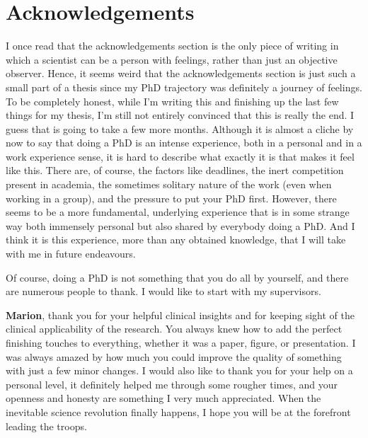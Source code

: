 \chapter{Acknowledgements}
\begin{ChapterAbstractNoTitle}
\end{ChapterAbstractNoTitle}

I once read that the acknowledgements section is the only piece of writing in which a scientist can be a person with feelings, rather than just an objective observer.
Hence, it seems weird that the acknowledgements section is just such a small part of a thesis since my PhD trajectory was definitely a journey of feelings.
To be completely honest, while I'm writing this and finishing up the last few things for my thesis, I'm still not entirely convinced that this is really the end. I guess that is going to take a few more months.
Although it is almost a cliche by now to say that doing a PhD is an intense experience, both in a personal and in a work experience sense, it is hard to describe what exactly it is that makes it feel like this.
There are, of course, the factors like deadlines, the inert competition present in academia, the sometimes solitary nature of the work (even when working in a group), and the pressure to put your PhD first.
However, there seems to be a more fundamental, underlying experience that is in some strange way both immensely personal but also shared by everybody doing a PhD.
And I think it is this experience, more than any obtained knowledge, that I will take with me in future endeavours.

Of course, doing a PhD is not something that you do all by yourself, and there are numerous people to thank.
I would like to start with my supervisors.

\textbf{Marion}, thank you for your helpful clinical insights and for keeping sight of the clinical applicability of the research.
You always knew how to add the perfect finishing touches to everything, whether it was a paper, figure, or presentation. I was always amazed by how much you could improve the quality of something with just a few minor changes.
I would also like to thank you for your help on a personal level, it definitely helped me through some rougher times, and your openness and honesty are something I very much appreciated.
When the inevitable science revolution finally happens, I hope you will be at the forefront leading the troops.


